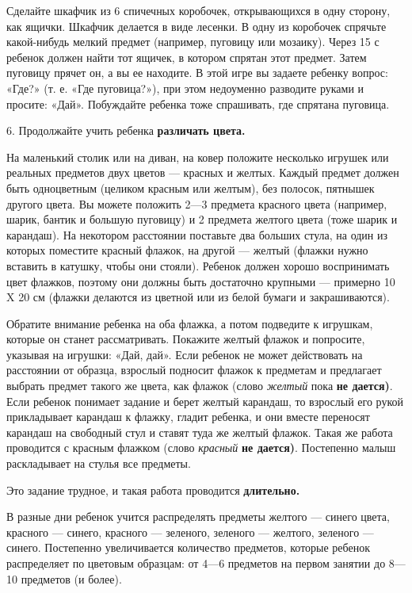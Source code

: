 \documentclass{book}
\renewcommand{\emph}[1]{\textit{#1}}
\begin{document}
Сделайте шкафчик из 6 спичечных коробочек, открывающихся в одну сторону,
как ящички. Шкафчик делается в виде лесенки. В одну из коробочек
спрячьте какой-нибудь мелкий предмет (например, пуговицу или мозаику).
Через 15 с ребенок должен найти тот ящичек, в котором спрятан этот
предмет. Затем пуговицу прячет он, а вы ее находите. В этой игре вы
задаете ребенку вопрос: «Где?» (т. е. «Где пуговица?»), при этом
недоуменно разводите руками и просите: «Дай». Побуждайте ребенка тоже
спрашивать, где спрятана пуговица.

6. Продолжайте учить ребенка \textbf{различать цвета.}

На маленький столик или на диван, на ковер положите несколько игрушек
или реальных предметов двух цветов --- красных и желтых. Каждый предмет
должен быть одноцветным (целиком красным или желтым), без полосок,
пятнышек другого цвета. Вы можете положить 2---3 предмета красного цвета
(например, шарик, бантик и большую пуговицу) и 2 предмета желтого цвета
(тоже шарик и карандаш). На некотором расстоянии поставьте два больших
стула, на один из которых поместите красный флажок, на другой --- желтый
(флажки нужно вставить в катушку, чтобы они стояли). Ребенок должен
хорошо воспринимать цвет флажков, поэтому они должны быть достаточно
крупными --- примерно 10 X 20 см (флажки делаются из цветной или из
белой бумаги и закрашиваются).

Обратите внимание ребенка на оба флажка, а потом подведите к игрушкам,
которые он станет рассматривать. Покажите желтый флажок и попросите,
указывая на игрушки: «Дай, дай». Если ребенок не может действовать на
расстоянии от образца, взрослый подносит флажок к предметам и предлагает
выбрать предмет такого же цвета, как флажок (слово \emph{желтый} пока
\textbf{не дается)}. Если ребенок понимает задание и берет желтый
карандаш, то взрослый его рукой прикладывает карандаш к флажку, гладит
ребенка, и они вместе переносят карандаш на свободный стул и ставят туда
же желтый флажок. Такая же работа проводится с красным флажком (слово
\emph{красный} \textbf{не дается)}. Постепенно малыш раскладывает на
стулья все предметы.

Это задание трудное, и такая работа проводится \textbf{длительно.}

В разные дни ребенок учится распределять предметы желтого --- синего
цвета, красного --- синего, красного --- зеленого, зеленого --- желтого,
зеленого --- синего. Постепенно увеличивается количество предметов,
которые ребенок распределяет по цветовым образцам: от 4---6 предметов на
первом занятии до 8---10 предметов (и более).
\end{document}
